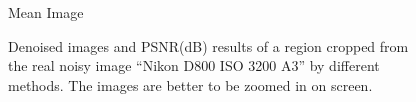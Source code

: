 \begin{figure}
{\begin{minipage}[t]{0.19\textwidth}
{\footnotesize Mean Image}
\end{minipage}
}
    \caption{Denoised images and PSNR(dB) results of a region cropped from the real noisy image ``Nikon D800 ISO 3200 A3'' \cite{crosschannel2016} by different methods. The images are better to be zoomed in on screen.}
    \label{fig3-15}
\end{figure}

\begin{figure}
    \centering
{}
\end{figure}
